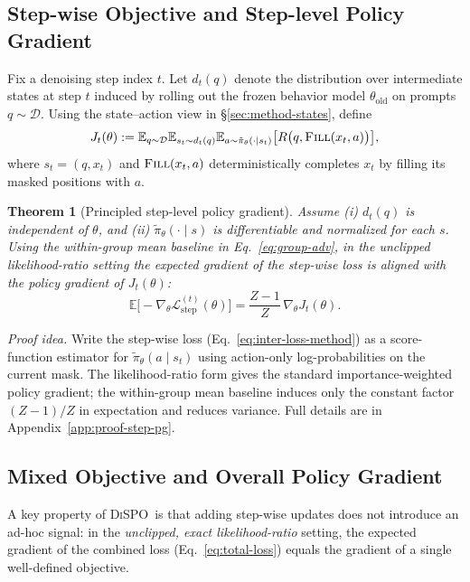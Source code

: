 \documentclass{article}
\newcommand{\method}{{\textsc{DiSPO}}}
\theoremstyle{plain}
\newtheorem{theorem}{Theorem}[section]
\theoremstyle{definition}
\theoremstyle{remark}
\begin{document}
\subsection{Step-wise Objective and Step-level Policy Gradient}
\label{sec:theory-step}

Fix a denoising step index $t$.
Let $d_t(q)$ denote the distribution over intermediate states at step $t$ induced by rolling out the frozen behavior model $\theta_{\text{old}}$ on prompts $q\sim\mathcal{D}$.
Using the state--action view in \S\ref{sec:method-states}, define
\begin{equation}
  J_t(\theta)
  :=
  \mathbb{E}_{q \sim \mathcal{D}}
  \mathbb{E}_{s_t \sim d_t(q)}
  \mathbb{E}_{a \sim \tilde{\pi}_\theta(\cdot \mid s_t)}
  \bigl[ R\bigl(q,\textsc{Fill}(x_t,a)\bigr) \bigr],
  \label{eq:Jt-def}
\end{equation}
where $s_t=(q,x_t)$ and $\textsc{Fill}(x_t,a)$ deterministically completes $x_t$ by filling its masked positions with $a$.


\begin{theorem}[Principled step-level policy gradient]\label{thm:step-pg}
Assume (i) $d_t(q)$ is independent of $\theta$, and (ii) $\tilde{\pi}_\theta(\cdot\mid s)$ is differentiable and normalized for each $s$.
Using the within-group mean baseline in Eq.~\ref{eq:group-adv}, in the unclipped likelihood-ratio setting the expected gradient of the step-wise loss is aligned with the policy gradient of $J_t(\theta)$:
\begin{equation}
  \mathbb{E}\bigl[-\nabla_\theta \mathcal{L}_{\text{step}}^{(t)}(\theta)\bigr]
  =
  \frac{Z-1}{Z}\,\nabla_\theta J_t(\theta).
  \label{eq:step-pg-main}
\end{equation}
\end{theorem}


\emph{Proof idea.}
Write the step-wise loss (Eq.~\ref{eq:inter-loss-method}) as a score-function estimator for $\tilde{\pi}_\theta(a\mid s_t)$ using action-only log-probabilities on the current mask.
The likelihood-ratio form gives the standard importance-weighted policy gradient; the within-group mean baseline induces only the constant factor $(Z-1)/Z$ in expectation and reduces variance.
Full details are in Appendix~\ref{app:proof-step-pg}.




\subsection{Mixed Objective and Overall Policy Gradient}
\label{sec:theory-mixed}
A key property of \method\ is that adding step-wise updates does not introduce an ad-hoc signal: in the \emph{unclipped, exact likelihood-ratio} setting, the expected gradient of the combined loss (Eq.~\ref{eq:total-loss}) equals the gradient of a single well-defined objective.
\end{document}
